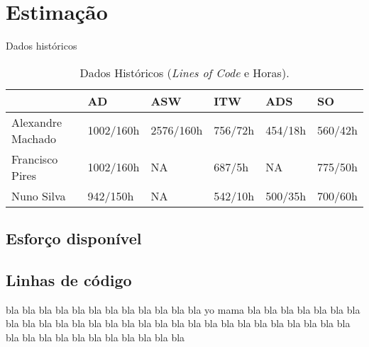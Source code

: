 \documentclass[12pt, a4paper, twoside]{report} %
\begin{document}
\clearpage

\section{Estimação}

Dados históricos

\begin{table}[h]
\centering
\begin{tabular}{|l|l|l|l|l|l|}
\hline
                  & AD        & ASW       & ITW     & ADS     & SO      \\ \hline
Alexandre Machado & 1002/160h & 2576/160h & 756/72h & 454/18h & 560/42h \\ \hline
Francisco Pires   & 1002/160h & NA        & 687/5h  & NA      & 775/50h \\ \hline
Nuno Silva        & 942/150h  & NA        & 542/10h & 500/35h & 700/60h\\ \hline
\end{tabular}
\caption{ Dados Históricos (\textit{Lines of Code} e Horas).}
\label{my-label}
\end{table}

\subsection{Esforço disponível}

\subsection{Linhas de código}

bla bla bla bla bla bla bla bla bla bla bla bla yo mama bla bla bla bla bla bla bla bla bla bla bla bla bla bla bla bla bla bla bla bla bla bla bla bla bla bla bla bla bla bla bla bla bla bla bla bla bla bla bla 
\end{document}
